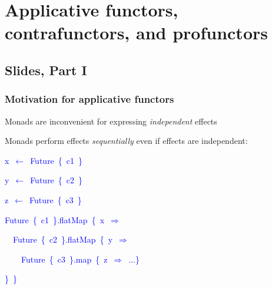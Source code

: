 
\chapter{Applicative functors, contrafunctors, and profunctors\label{chap:8-Applicative-functors,-contrafunc}}

\section{Slides, Part I}

\subsection{Motivation for applicative functors}

\vspace{-0.25cm}Monads are inconvenient for expressing \emph{independent}
effects

Monads perform effects \emph{sequentially} even if effects are independent:\texttt{\textcolor{blue}{\footnotesize{}\medskip{}
}}{\footnotesize\par}

\texttt{\textcolor{blue}{\footnotesize{}}}%
\begin{minipage}[c][1\totalheight][t]{0.4\columnwidth}%
\begin{lyxcode}
\textcolor{blue}{\footnotesize{}x~$\leftarrow$~Future~\{~c1~\}}{\footnotesize\par}

\textcolor{blue}{\footnotesize{}y~$\leftarrow$~Future~\{~c2~\}}{\footnotesize\par}

\textcolor{blue}{\footnotesize{}z~$\leftarrow$~Future~\{~c3~\}}{\footnotesize\par}
\end{lyxcode}
%
\end{minipage}\texttt{\textcolor{blue}{\footnotesize{}\hfill{}}}%
\begin{minipage}[c][1\totalheight][t]{0.4\columnwidth}%
\begin{lyxcode}
\textcolor{blue}{\footnotesize{}Future~\{~c1~\}.flatMap~\{~x~$\Rightarrow$}{\footnotesize\par}

\textcolor{blue}{\footnotesize{}~~Future~\{~c2~\}.flatMap~\{~y~$\Rightarrow$}{\footnotesize\par}

\textcolor{blue}{\footnotesize{}~~~~Future~\{~c3~\}.map~\{~z~$\Rightarrow$~...\}}{\footnotesize\par}

\textcolor{blue}{\footnotesize{}\}~\}}{\footnotesize\par}
\end{lyxcode}
%
\end{minipage}\texttt{\textcolor{blue}{\footnotesize{}\hfill{}\medskip{}
}}{\footnotesize\par}

